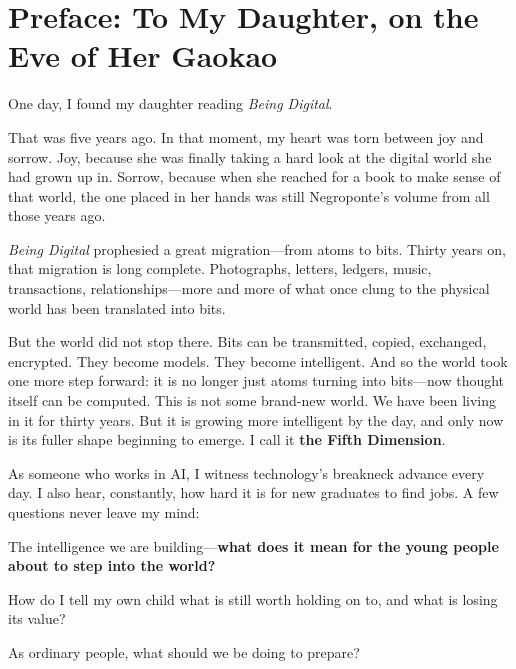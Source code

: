 
\chapter*{\centering Preface: To My Daughter, on the Eve of Her Gaokao}

One day, I found my daughter reading \emph{Being Digital}.

That was five years ago. In that moment, my heart was torn between joy and sorrow. Joy, because she was finally taking a hard look at the digital world she had grown up in. Sorrow, because when she reached for a book to make sense of that world, the one placed in her hands was still Negroponte's volume from all those years ago.

\vspace{1em}


\emph{Being Digital} prophesied a great migration---from atoms to bits.
Thirty years on, that migration is long complete. Photographs, letters, ledgers, music, transactions, relationships---more and more of what once clung to the physical world has been translated into bits.

\vspace{1em}

But the world did not stop there. Bits can be transmitted, copied, exchanged, encrypted. They become models. They become intelligent.
And so the world took one more step forward: it is no longer just atoms turning into bits---now thought itself can be computed.
This is not some brand-new world. We have been living in it for thirty years. But it is growing more intelligent by the day, and only now is its fuller shape beginning to emerge. I call it \textbf{the Fifth Dimension}.

\vspace{1em}

As someone who works in AI, I witness technology's breakneck advance every day. I also hear, constantly, how hard it is for new graduates to find jobs. A few questions never leave my mind:

The intelligence we are building---\textbf{what does it mean for the young people about to step into the world?}

How do I tell my own child what is still worth holding on to, and what is losing its value?

As ordinary people, what should we be doing to prepare?

\vspace{1em}

